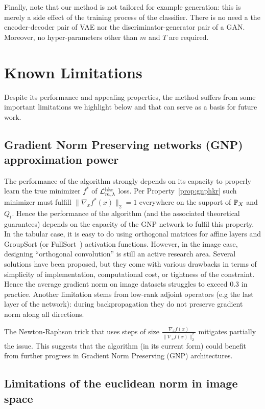 Finally, note that our method is not tailored for example generation: this is merely a side effect of the training process of the classifier. There is no need a the encoder-decoder pair of VAE nor the discriminator-generator pair of a GAN. Moreover, no hyper-parameters other than $m$ and $T$ are required.   

\section{Known Limitations}\label{app:limitations}

Despite its performance and appealing properties, the method suffers from some important limitations we highlight below and that can serve as a basis for future work. 

\subsection{Gradient Norm Preserving networks (GNP) approximation power}

The performance of the algorithm strongly depends on its capacity to properly learn the true minimizer $f^{*}$ of $\mathcal{L}^{\text{hkr}}_{m,\lambda}$ loss. Per Property~\ref{prop:gnphkr} such minimizer must fulfill $\|\nabla_x f^{*}(x)\|_2=1$ everywhere on the support of $\mathbb{P}_X$ and $Q_t$. Hence the performance of the algorithm (and the associated theoretical guarantees) depends on the capacity of the GNP network to fulfil this property. In the tabular case, it is easy to do using orthogonal matrices for affine layers and GroupSort (or FullSort~\cite{anil2019sorting}) activation functions. However, in the image case, designing ``orthogonal convolution'' is still an active research area. Several solutions have been proposed, but they come with various drawbacks in terms of simplicity of implementation, computational cost, or tightness of the constraint. Hence the average gradient norm on image datasets struggles to exceed $0.3$ in practice. Another limitation stems from low-rank adjoint operators (e.g the last layer of the network): during backpropagation they do not preserve gradient norm along all directions.  
  
The Newton-Raphson trick that uses steps of size $\frac{\nabla_x f(x)}{\|\nabla_x f(x)\|_2^2}$ mitigates partially the issue. This suggests that the algorithm (in its current form) could benefit from further progress in Gradient Norm Preserving (GNP) architectures.  

\subsection{Limitations of the euclidean norm in image space}

